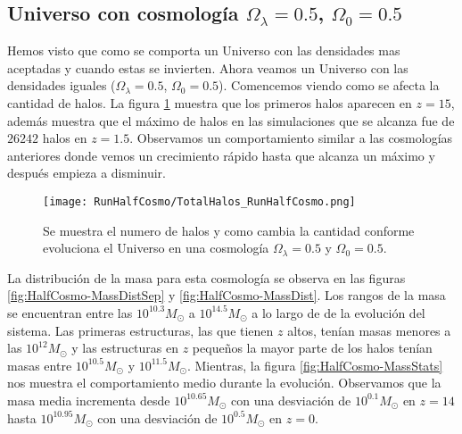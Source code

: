 \subsection{Universo con cosmología \texorpdfstring{$\Omega_\lambda = 0.5$, $\Omega_0 = 0.5$ }{Omega lambda = 0.5, Omega 0 = 0.5} }

Hemos visto que como se comporta un Universo con las densidades mas aceptadas y cuando estas se invierten. Ahora veamos un Universo con las densidades iguales ($\Omega_\lambda = 0.5$, $\Omega_0 = 0.5$). Comencemos viendo como se afecta la cantidad de halos. La figura \ref{fig:HalfCosmo-TotalHalos} muestra que los primeros halos aparecen en $z=15$, además muestra que el máximo de halos en las simulaciones que se alcanza fue de $26242$ halos en $z=1.5$. Observamos un comportamiento similar a las cosmologías anteriores donde vemos un crecimiento rápido hasta que alcanza un máximo y después empieza a disminuir.

\begin{figure}[H]
    \centering
    \texttt{[image: RunHalfCosmo/TotalHalos\_RunHalfCosmo.png]}
    \caption[Evolución del número de halos en un Universo $\Omega_\lambda = 0.5 $, $\Omega_0 = 0.5$]{\footnotesize Se muestra el numero de halos y como cambia la cantidad conforme evoluciona el Universo en una cosmología $\Omega_\lambda = 0.5 $ y $\Omega_0 = 0.5$.}    
    \label{fig:HalfCosmo-TotalHalos}
\end{figure}

La distribución de la masa para esta cosmología se observa en las figuras \ref{fig:HalfCosmo-MassDistSep} y \ref{fig:HalfCosmo-MassDist}. Los rangos de la masa se encuentran entre las $10^{10.3}M_\odot$ a $10^{14.5}M_\odot$ a lo largo de de la evolución del sistema. Las primeras estructuras, las que tienen $z$ altos, tenían masas menores a las $10^{12}M_\odot$ y las estructuras en $z$ pequeños la mayor parte de los halos tenían masas entre $10^{10.5}M_\odot$ y $10^{11.5}M_\odot$. Mientras, la figura \ref{fig:HalfCosmo-MassStats} nos muestra el comportamiento medio durante la evolución. Observamos que la masa media incrementa desde $10^{10.65}M_\odot$ con una desviación de $10^{0.1}M_\odot$ en $z=14$ hasta $10^{10.95}M_\odot$ con una desviación de $10^{0.5}M_\odot$ en $z=0$.

